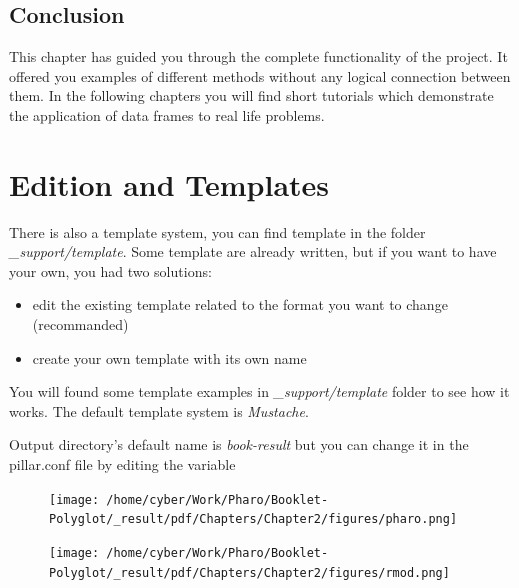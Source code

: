 \documentclass[10pt,twoside,english]{_support/latex/sbabook/sbabook}
\begin{document}
\section{Conclusion}
This chapter has guided you through the complete functionality of the  project. It offered you examples of different methods without any logical connection between them. In the following chapters you will find short tutorials which demonstrate the application of data frames to real life problems.


\chapter{Edition and Templates}
There is also a template system, you can find template in the folder \textit{\_support/template}.
Some template are already written, but if you want to have your own, you had two solutions:

\begin{itemize}
\item edit the existing template related to the format you want to change (recommanded)
\item create your own template with its own name
\end{itemize}

You will found some template examples in \textit{\_support/template} folder to see how it works.
The default template system is \textit{Mustache}.

Output directory's default name is \textit{book-result} but you can change it in the pillar.conf file by editing the
 variable


\begin{figure}

\begin{center}
\texttt{[image: /home/cyber/Work/Pharo/Booklet-Polyglot/\_result/pdf/Chapters/Chapter2/figures/pharo.png]}\caption{\label{/home/cyber/Work/Pharo/Booklet-Polyglot/_result/pdf/Chapters/Chapter2/figures/pharo.png}}\end{center}
\end{figure}


\begin{figure}

\begin{center}
\texttt{[image: /home/cyber/Work/Pharo/Booklet-Polyglot/\_result/pdf/Chapters/Chapter2/figures/rmod.png]}\caption{\label{/home/cyber/Work/Pharo/Booklet-Polyglot/_result/pdf/Chapters/Chapter2/figures/rmod.png}}\end{center}
\end{figure}








\backmatter

\end{document}
